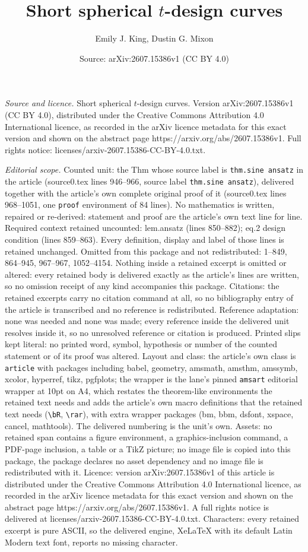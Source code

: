 \documentclass[10pt,a4paper]{amsart}
\title[Short spherical $t$-design curves]{Short spherical $t$-design curves}
\author{Emily J. King, Dustin G. Mixon}
\date{Source: arXiv:2607.15386v1 (CC BY 4.0)}
\begin{document}
\maketitle

\noindent\emph{Source and licence.} Short spherical $t$-design curves. Version arXiv:2607.15386v1 (CC BY 4.0), distributed under the Creative Commons Attribution 4.0 International licence, as recorded in the arXiv licence metadata for this exact version and shown on the abstract page https://arxiv.org/abs/2607.15386v1. Full rights notice: licenses/arxiv-2607.15386-CC-BY-4.0.txt.\par\smallskip

\noindent\textit{Editorial scope.} Counted unit: the Thm whose source label is \texttt{thm.sine ansatz} in the article (source0.tex lines 946--966, source label \texttt{thm.sine ansatz}), delivered together with the article's own complete original proof of it (source0.tex lines 968--1051, one \texttt{proof} environment of 84 lines). No mathematics is written, repaired or re-derived: statement and proof are the article's own text line for line. Required context retained uncounted: lem.ansatz (lines 850--882); eq.2 design condition (lines 859--863). Every definition, display and label of those lines is retained unchanged. Omitted from this package and not redistributed: 1--849, 864--945, 967--967, 1052--4154. Nothing inside a retained excerpt is omitted or altered: every retained body is delivered exactly as the article's lines are written, so no omission receipt of any kind accompanies this package. Citations: the retained excerpts carry no citation command at all, so no bibliography entry of the article is transcribed and no reference is redistributed. Reference adaptation: none was needed and none was made; every reference inside the delivered unit resolves inside it, so no unresolved reference or citation is produced. Printed slips kept literal: no printed word, symbol, hypothesis or number of the counted statement or of its proof was altered. Layout and class: the article's own class is \texttt{article} with packages including babel, geometry, amsmath, amsthm, amssymb, xcolor, hyperref, tikz, pgfplots; the wrapper is the lane's pinned \texttt{amsart} editorial wrapper at 10pt on A4, which restates the theorem-like environments the retained text needs and adds the article's own macro definitions that the retained text needs (\texttt{\textbackslash bR}, \texttt{\textbackslash rar}), with extra wrapper packages (bm, bbm, dsfont, xspace, cancel, mathtools). The delivered numbering is the unit's own. Assets: no retained span contains a figure environment, a graphics-inclusion command, a PDF-page inclusion, a table or a TikZ picture; no image file is copied into this package, the package declares no asset dependency and no image file is redistributed with it. Licence: version arXiv:2607.15386v1 of this article is distributed under the Creative Commons Attribution 4.0 International licence, as recorded in the arXiv licence metadata for this exact version and shown on the abstract page https://arxiv.org/abs/2607.15386v1. A full rights notice is delivered at licenses/arxiv-2607.15386-CC-BY-4.0.txt. Characters: every retained excerpt is pure ASCII, so the delivered engine, XeLaTeX with its default Latin Modern text font, reports no missing character.
\end{document}
